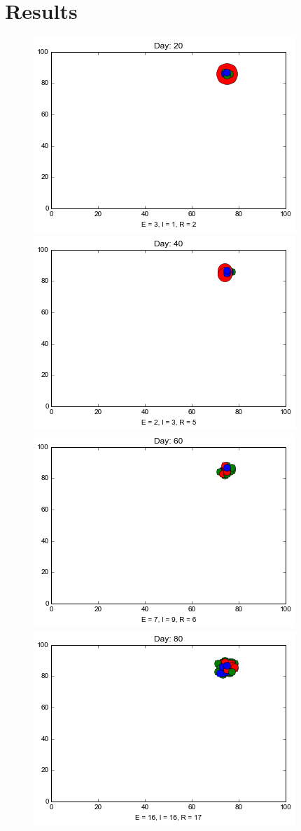 \section{Results}

\begin{figure}
\centering
\includegraphics[scale=0.25]{images/1t20.png} \quad
\includegraphics[scale=0.25]{images/1t40.png} \quad
\includegraphics[scale=0.25]{images/1t60.png} \quad
\includegraphics[scale=0.25]{images/1t80.png} 


\end{figure}
